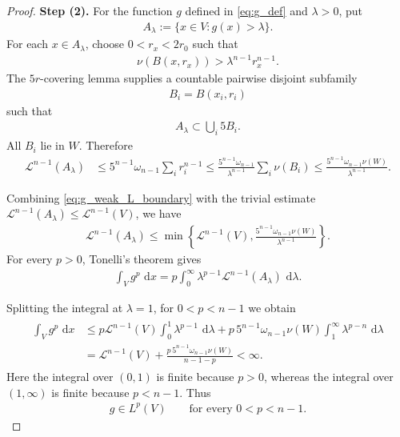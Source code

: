 \documentclass[10pt,a4paper]{amsart}
\newcommand{\dd}{\,\mathrm{d}}
\begin{document}
\begin{proof}
\textbf{Step (2).}
For the function \(g\) defined in \eqref{eq:g_def} and
\(\lambda>0\), put
\begin{align}
A_\lambda:=\{x\in V:g(x)>\lambda\}.\nonumber
\end{align}
For each \(x\in A_\lambda\), choose \(0<r_x<2r_0\) such that
\begin{align}
\nu(B(x,r_x))>\lambda^{n-1} r_x^{n-1}.\nonumber
\end{align}
The \(5r\)-covering lemma supplies a countable pairwise disjoint
subfamily
\begin{align}
B_i=B(x_i,r_i)\nonumber
\end{align}
such that
\begin{align}
A_\lambda\subset\bigcup_i5B_i.\nonumber
\end{align}
All \(B_i\) lie in \(W\).  Therefore
\begin{align}
\mathcal L^{n-1}(A_\lambda)
&\leq
5^{n-1}\omega_{n-1}\sum_i r_i^{n-1}\leq
\frac{5^{n-1}\omega_{n-1}}{\lambda^{n-1}}
\sum_i\nu(B_i)\leq
\frac{5^{n-1}\omega_{n-1}\nu(W)}{\lambda^{n-1}}.
\label{eq:g_weak_L_boundary}
\end{align}


Combining \eqref{eq:g_weak_L_boundary} with the trivial estimate
\(\mathcal L^{n-1}(A_\lambda)\leq\mathcal L^{n-1}(V)\), we have
\begin{align}
\mathcal L^{n-1}(A_\lambda)
\leq
\min\left\{
\mathcal L^{n-1}(V),
\frac{5^{n-1}\omega_{n-1}\nu(W)}
{\lambda^{n-1}}
\right\}.
\nonumber
\end{align}
For every \(p>0\), Tonelli's theorem gives
\begin{align}
\int_Vg^p\,\dd x
=
p\int_0^\infty
\lambda^{p-1}\mathcal L^{n-1}(A_\lambda)\,\dd\lambda.
\nonumber
\end{align}

Splitting the integral at \(\lambda=1\), for \(0<p<n-1\) we obtain
\begin{align}
\begin{aligned}
\int_Vg^p\,\dd x
&\leq
p\mathcal L^{n-1}(V)
\int_0^1\lambda^{p-1}\,\dd\lambda+
p\,5^{n-1}\omega_{n-1}\nu(W)
\int_1^\infty\lambda^{p-n}\,\dd\lambda\\
&=
\mathcal L^{n-1}(V)
+
\frac{
p\,5^{n-1}\omega_{n-1}\nu(W)
}{
n-1-p
}
<\infty.
\end{aligned}
\nonumber
\end{align}
Here the integral over \((0,1)\) is finite because \(p>0\), whereas
the integral over \((1,\infty)\) is finite because \(p<n-1\).
Thus
\begin{align}
g\in L^p(V)
\qquad
\text{for every }0<p<n-1.
\label{eq:g_Lp}
\end{align}


\end{proof}
\end{document}
